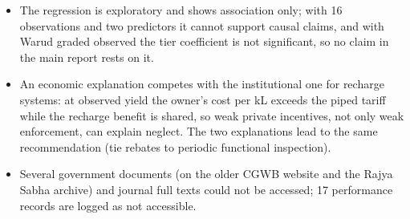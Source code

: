 \begin{itemize}
\item The regression is exploratory and shows association only; with 16 observations and two predictors it cannot support causal claims, and with Warud graded observed the tier coefficient is not significant, so no claim in the main report rests on it.
\item An economic explanation competes with the institutional one for recharge systems: at observed yield the owner's cost per kL exceeds the piped tariff while the recharge benefit is shared, so weak private incentives, not only weak enforcement, can explain neglect. The two explanations lead to the same recommendation (tie rebates to periodic functional inspection).
\item Several government documents (on the older CGWB website and the Rajya Sabha archive) and journal full texts could not be accessed; 17 performance records are logged as not accessible.
\end{itemize}

